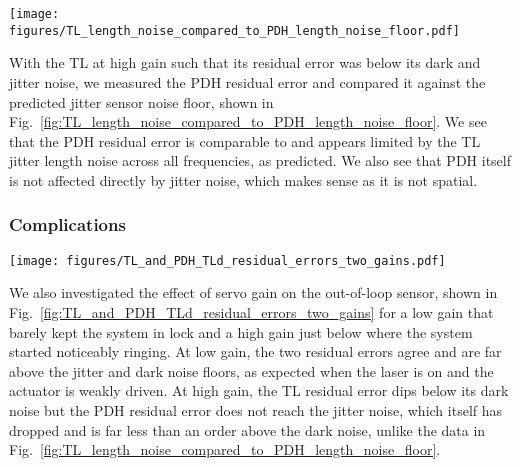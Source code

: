 \documentclass[aps,pra,superscriptaddress,reprint,nofootinbib]{revtex4-1}
\begin{document}
\begin{figure*}
	\texttt{[image: figures/TL\_length\_noise\_compared\_to\_PDH\_length\_noise\_floor.pdf]}
	\caption{SR785 LF measurements from January 2021 of TL and PDH dark and jitter noise projected into length noise using the error signal slopes. Comparing to projected PDH residual error noise floor at high gain, with normalised DC voltage.}
	\label{fig:TL_length_noise_compared_to_PDH_length_noise_floor}
\end{figure*}

With the TL at high gain such that its residual error was below its dark and jitter noise, we measured the PDH residual error and compared it against the predicted jitter sensor noise floor, shown in Fig.~\ref{fig:TL_length_noise_compared_to_PDH_length_noise_floor}. We see that the PDH residual error is comparable to and appears limited by the TL jitter length noise across all frequencies, as predicted. We also see that PDH itself is not affected directly by jitter noise, which makes sense as it is not spatial.

\subsubsection{Complications}

\begin{figure*}
	\texttt{[image: figures/TL\_and\_PDH\_TLd\_residual\_errors\_two\_gains.pdf]}
	\caption{SR785 LF measurements from 2021-01-20 of TL and PDH dark and jitter noise projected into length noise. Compared against high and low gain residual errors. Note that this data was taken after that in shown in Fig.~\ref{fig:TL_length_noise_compared_to_PDH_length_noise_floor}.}
	\label{fig:TL_and_PDH_TLd_residual_errors_two_gains}
\end{figure*}

We also investigated the effect of servo gain on the out-of-loop sensor, shown in Fig.~\ref{fig:TL_and_PDH_TLd_residual_errors_two_gains} for a low gain that barely kept the system in lock and a high gain just below where the system started noticeably ringing. At low gain, the two residual errors agree and are far above the jitter and dark noise floors, as expected when the laser is on and the actuator is weakly driven. At high gain, the TL residual error dips below its dark noise but the PDH residual error does not reach the jitter noise, which itself has dropped and is far less than an order above the dark noise, unlike the data in Fig.~\ref{fig:TL_length_noise_compared_to_PDH_length_noise_floor}.
\end{document}
